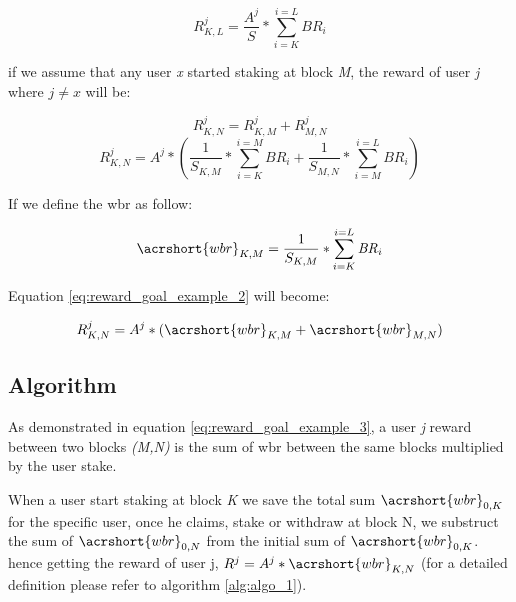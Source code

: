 \documentclass[a4paper]{article}
\begin{document}
\begin{equation} \label{eq:reward_formula_fixed}
R_{K,L}^{j}= \frac{A^j}{S} * \sum_{i=K}^{i=L} \mathit{BR}_i
\end{equation}
\begin{flushleft}
if we assume that any user \textit{x} started staking at block \textit{M}, the reward of user \textit{j} where $j\neq x$ will be:
\end{flushleft}
\begin{equation} \label{eq:reward_goal_example}
R_{K,N}^{j}= R_{K,M}^{j} + R_{M,N}^{j}
\end{equation}
\begin{equation} \label{eq:reward_goal_example_2}
R_{K,N}^{j}= A^j*(\frac{1}{S_{K,M}} * \sum_{i=K}^{i=M} \mathit{BR}_i + \frac{1}{S_{M,N}} * \sum_{i=M}^{i=L} \mathit{BR}_i)
\end{equation}
\begin{flushleft}
If we define the \acrfull{wbr} as follow:
\end{flushleft}
\begin{equation} \label{eq:weighted_block_reward}
\acrshort{wbr}_{K,M}= \frac{1}{S_{K,M}}*\sum_{i=K}^{i=L} \mathit{BR}_i
\end{equation}
\begin{flushleft}
Equation \ref{eq:reward_goal_example_2} will become:
\end{flushleft}
\begin{equation} \label{eq:reward_goal_example_3}
R_{K,N}^{j}= A^j*(\acrshort{wbr}_{K,M} + \acrshort{wbr}_{M,N})
\end{equation}
\subsection{Algorithm}
\noindent
As demonstrated in equation \ref{eq:reward_goal_example_3}, a user \textit{j} reward between two blocks \textit{(M,N)} is the sum of \acrshort{wbr} between the same blocks multiplied by the user stake.\par
\noindent
When a user start staking at block \textit{K} we save the total sum $\acrshort{wbr}_{0,K}$ for the specific user, once he claims, stake or withdraw at block N, we substruct the sum of $\acrshort{wbr}_{0,N}$ from the initial sum of $\acrshort{wbr}_{0,K}$. hence getting the reward of user j, $R^j=A^j*\acrshort{wbr}_{K,N}$ (for a detailed definition please refer to algorithm \ref{alg:algo_1}).\par
\end{document}
